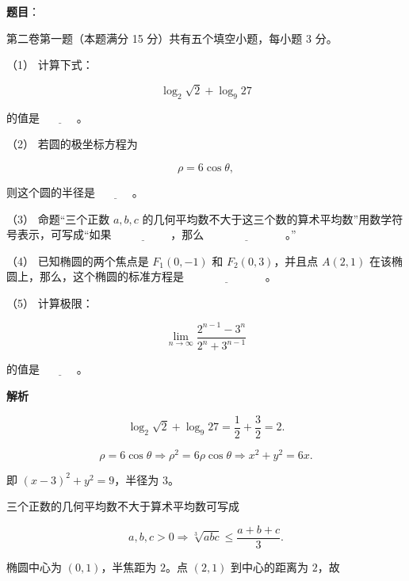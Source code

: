 \begin{answer}

\textbf{题目}：

第二卷第一题（本题满分 15 分）共有五个填空小题，每小题 3 分。

（1） 计算下式：

\nopagebreak[4]
\[
\log_2\sqrt2+\log_9 27
\]

的值是 $\underline{\hspace{3em}}$。

（2） 若圆的极坐标方程为

\nopagebreak[4]
\[
\rho=6\cos\theta,
\]

则这个圆的半径是 $\underline{\hspace{3em}}$。

（3） 命题“三个正数 $a,b,c$ 的几何平均数不大于这三个数的算术平均数”用数学符号表示，可写成“如果 $\underline{\hspace{5em}}$，那么 $\underline{\hspace{7em}}$。”

（4） 已知椭圆的两个焦点是 $F_1(0,-1)$ 和 $F_2(0,3)$，并且点 $A(2,1)$ 在该椭圆上，那么，这个椭圆的标准方程是 $\underline{\hspace{7em}}$。

（5） 计算极限：

\nopagebreak[4]
\[
\lim_{n\to\infty}\frac{2^{n-1}-3^n}{2^n+3^{n-1}}
\]

的值是 $\underline{\hspace{3em}}$。

\textbf{解析}


\nopagebreak[4]
\[
\log_2\sqrt2+\log_9 27
=\frac12+\frac32=2.
\]


\nopagebreak[4]
\[
\rho=6\cos\theta
\Longrightarrow
\rho^2=6\rho\cos\theta
\Longrightarrow
x^2+y^2=6x.
\]

即 $(x-3)^2+y^2=9$，半径为 $3$。


三个正数的几何平均数不大于算术平均数可写成

\nopagebreak[4]
\[
a,b,c>0
\Longrightarrow
\sqrt[3]{abc}\le\frac{a+b+c}{3}.
\]


椭圆中心为 $(0,1)$，半焦距为 $2$。点 $(2,1)$ 到中心的距离为 $2$，故


\end{answer}
